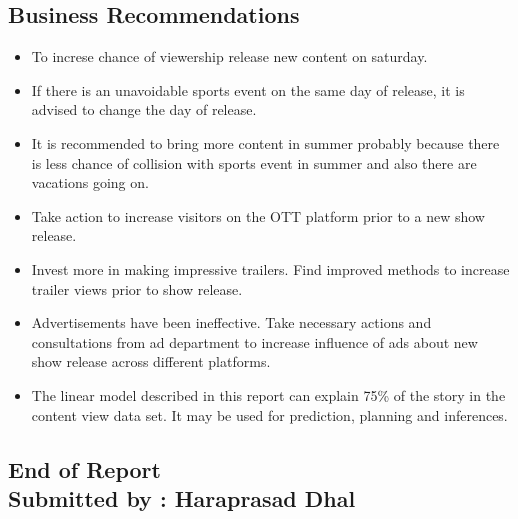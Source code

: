\documentclass[12pt,a4paper]{style}
\begin{document}
\subsection{Business Recommendations}
\begin{itemize}
	\item To increse chance of viewership release new content on saturday.
	\item If there is an unavoidable sports event on the same day of release, it is advised to change the day of release.
	\item It is recommended to bring more content in summer probably because there is less chance of collision with sports event in summer and also there are vacations going on.  
	\item Take action to increase visitors on the OTT platform prior to a new show release. 
	\item Invest more in making impressive trailers. Find improved methods to increase trailer views prior to show release.
	\item Advertisements have been ineffective. Take necessary actions and consultations from ad department to increase influence of ads about new show release across different  platforms.
	\item The linear model described in this report can explain 75\% of the story in the content view data set. It may be used for prediction, planning and inferences.      
\end{itemize}
\begin{centering}
\vspace{20pt}
\subsection*{End of Report\\Submitted by : Haraprasad Dhal}
\end{centering}
\clearpage
\end{document}
